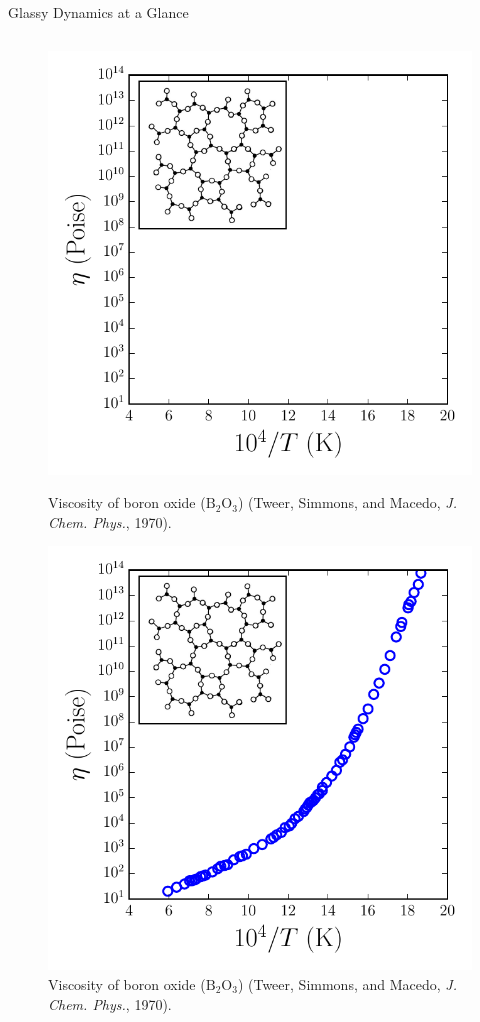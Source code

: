 \begin{frame}{Glassy Dynamics at a Glance}
\begin{columns}
\begin{column}{0.5\linewidth}
\begin{figure}
\begin{overprint}
    \centering\includegraphics[height=0.675\textheight]{intro_glassy/timerelax_b2o3_0.pdf}
    \caption{Viscosity of boron oxide ($\mathrm{B_2 O_3}$) (Tweer, Simmons, and Macedo, \textit{J. Chem. Phys.},  1970).}
    
    
    \centering\includegraphics[height=0.675\textheight]{intro_glassy/timerelax_b2o3_1.pdf}
    \caption{Viscosity of boron oxide ($\mathrm{B_2 O_3}$) (Tweer, Simmons, and Macedo, \textit{J. Chem. Phys.},  1970).}
    

\end{overprint}
\end{figure}
\end{column}
\end{columns}
\end{frame}
